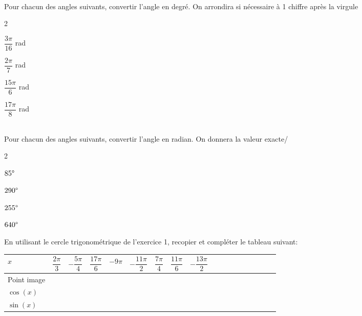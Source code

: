 \documentclass[11pt,a4paper]{article}  %
\begin{document}
\\
Pour chacun des angles suivants, convertir l'angle en degré. On arrondira si nécessaire à 1 chiffre après la virgule
\begin{multicols}{2}
	\begin{enumMet}
		\item $\dfrac{3\pi}{16}$ rad
		\item $\dfrac{2\pi}{7}$ rad
		\item $\dfrac{15\pi}{6}$ rad
		\item $\dfrac{17\pi}{8}$ rad
	\end{enumMet}
\end{multicols}

\\
Pour chacun des angles suivants, convertir l'angle en radian. On donnera la valeur exacte/
\begin{multicols}{2}
	\begin{enumMet}
		\item $85\degree$
		\item $290\degree$
		\item $255\degree$
		\item $640\degree$
	\end{enumMet}
\end{multicols}


En utilisant le cercle trigonométrique de l'exercice 1, recopier et compléter le tableau suivant:\\
\begin{tabular}{ | Xc | Xc | Xc | Xc | Xc | Xc | Xc | Xc | Xc |}
	\hline
	$x$  & $\dfrac{2\pi}{3}$ & $-\dfrac{5\pi}{4}$ & $\dfrac{17\pi}{6}$ &  $-9\pi$ & $-\dfrac{11\pi}{2}$ & $\dfrac{7\pi}{4}$ & $\dfrac{11\pi}{6}$ &  $-\dfrac{13\pi}{2}$\\ \hline
	Point image  &   &   &   &   &   & & & \\ \hline
	$\cos(x)$  &   &   &   &   &   & & & \\ \hline
	$\sin(x)$ &   &   &   &   &   & & & \\
	\hline  
\end{tabular}


\end{document}
